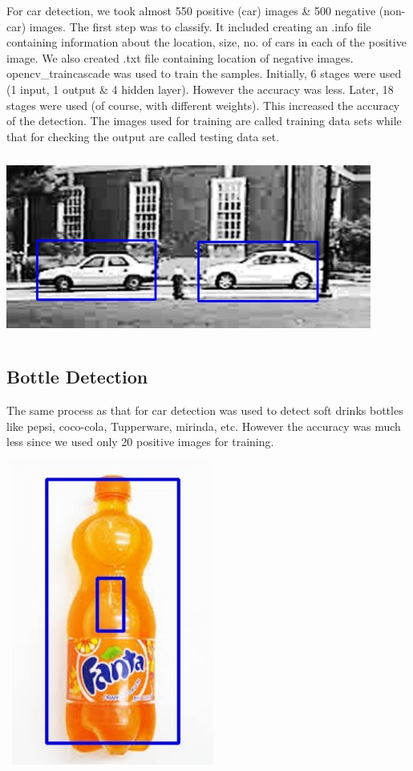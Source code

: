 \documentclass[a4paper,12pt]{article}
\begin{document}
For car detection, we took almost 550 positive (car) images \& 500 negative (non-car) images. The first step was to classify. 
It included creating an .info file containing information about the location, size, no. of cars in each of the positive image. 
We also created .txt file containing location of negative images. opencv\_traincascade was used to train the samples. Initially, 
6 stages were used (1 input, 1 output \& 4 hidden layer). However the accuracy was less. Later, 18 stages were used (of course, 
with different weights). This increased the accuracy of the detection. The images used for training are called training data sets 
while that for checking the output are called testing data set.

\begin{center}
	\graphicspath{ {images/} }
	\includegraphics[width=12cm, height=6cm]{car1}
\end{center}

\subsection{Bottle Detection}
The same process as that for car detection was used to detect soft drinks bottles like pepsi, coco-cola, Tupperware, mirinda, etc. 
However the accuracy was much less since we used only 20 positive images for training.

\begin{center}
	\graphicspath{ {images/} }
	\includegraphics[width=7cm, height=10cm]{bottle_detected}
\end{center}
\end{document}
